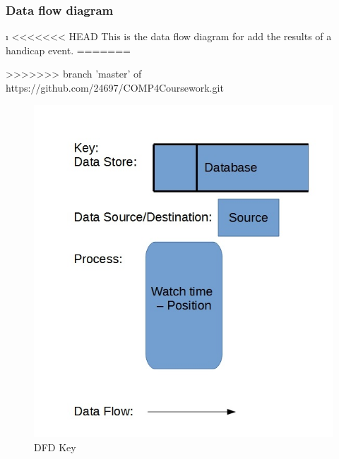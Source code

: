 \subsubsection{Data flow diagram}\i
<<<<<<< HEAD
This is the data flow diagram for add the results of a handicap event.
=======

>>>>>>> branch 'master' of https://github.com/24697/COMP4Coursework.git
\begin{figure}[H]
    \includegraphics[width=\textwidth]{./DFD/Done/JPG/DFDKey.jpg}
    \caption{DFD Key} \label{fig:DFD key}
\end{figure}

